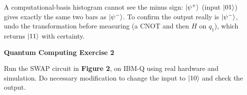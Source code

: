 \documentclass[a4paper, 10pt]{article}
\begin{document}
\begin{solution}
	\begin{remark}
		A computational-basis histogram cannot see the minus sign: \( \ket{\psi^{+}} \) (input \( \ket{01} \)) gives exactly the same two bars as \( \ket{\psi^{-}} \).
		To confirm the output really is \( \ket{\psi^{-}} \), undo the transformation before measuring (a CNOT and then \( H \) on \( q_1 \)), which returns \( \ket{11} \) with certainty.
	\end{remark}
\end{solution}

\begin{problem}
\textbf{Quantum Computing Exercise 2}
\par Run the SWAP circuit in \textbf{Figure 2}, on IBM-Q using real hardware and simulation.
Do necessary modification to change the input to \( \ket{10} \) and check the output.
\end{problem}
\end{document}

